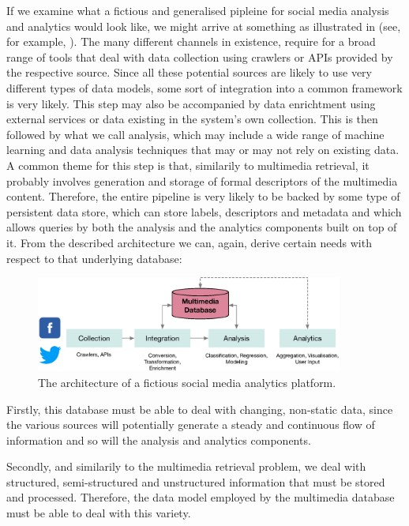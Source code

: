 If we examine what a fictious and generalised pipleine for social media analysis and analytics would look like, we might arrive at something as illustrated in  (see, for example, \cite{Cui:2019Defend,Yang:2019XFake,Bagade:2020Kauwa}). The many different channels in existence, require for a broad range of tools that deal with data collection using crawlers or APIs provided by the respective source. Since all these potential sources are likely to use very different types of data models, some sort of integration into a common framework is very likely. This step may also be accompanied by data enrichtment using external services or data existing in the system's own collection. This is then followed by what we call analysis, which may include a wide range of machine learning and data analysis techniques that may or may not rely on existing data. A common theme for this step is that, similarily to multimedia retrieval, it probably involves generation and storage of formal descriptors of the multimedia content. Therefore, the entire pipeline is very likely to be backed by some type of persistent data store, which can store labels, descriptors and metadata and which allows queries by both the analysis and the analytics components built on top of it. From the described architecture we can, again, derive certain needs with respect to that underlying database: 

\begin{figure}[tb]
    \centering
    \includegraphics[width=0.90\textwidth]{figures/social-media-architecture.eps}
    \caption{The architecture of a fictious social media analytics platform.}
    \label{figure:social-media}
\end{figure}

Firstly, this database must be able to deal with changing, non-static data, since the various sources will potentially generate a steady and continuous flow of information and so will the analysis and analytics components.

Secondly, and similarily to the multimedia retrieval problem, we deal with structured, semi-structured and unstructured information that must be stored and processed. Therefore, the data model employed by the multimedia database must be able to deal with this variety. 

